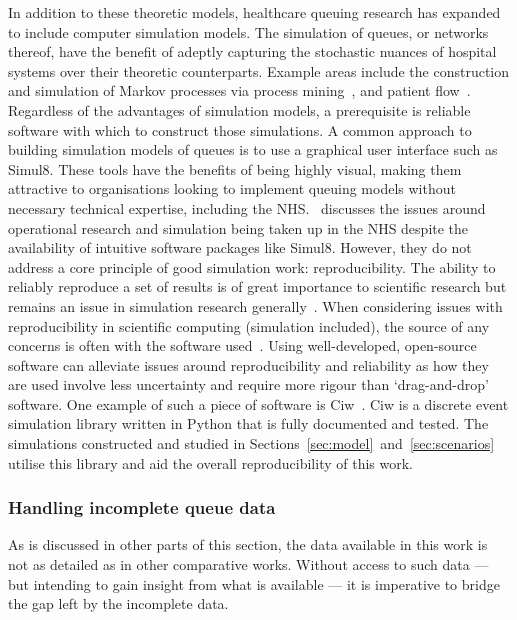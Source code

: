 \documentclass[11pt]{article}
\begin{document}
In addition to these theoretic models, healthcare queuing research has expanded
to include computer simulation models. The simulation of queues, or networks
thereof, have the benefit of adeptly capturing the stochastic nuances of
hospital systems over their theoretic counterparts. Example areas include the
construction and simulation of Markov processes via process
mining~\cite{Arnolds2018,Rebuge2012}, and patient flow~\cite{Bhattacharjee2014}.
Regardless of the advantages of simulation models, a prerequisite is reliable
software with which to construct those simulations. A common approach to
building simulation models of queues is to use a graphical user interface such
as Simul8. These tools have the benefits of being highly visual, making them
attractive to organisations looking to implement queuing models without
necessary technical expertise, including the NHS.~\cite{Brailsford2013}
discusses the issues around operational research and simulation being taken up
in the NHS despite the availability of intuitive software packages like Simul8.
However, they do not address a core principle of good simulation work:
reproducibility. The ability to reliably reproduce a set of results is of great
importance to scientific research but remains an issue in simulation research
generally~\cite{Fitzpatrick2019}. When considering issues with reproducibility
in scientific computing (simulation included), the source of any concerns is
often with the software used~\cite{Ivie2018}. Using well-developed, open-source
software can alleviate issues around reproducibility and reliability as how they
are used involve less uncertainty and require more rigour than ‘drag-and-drop’
software. One example of such a piece of software is Ciw~\cite{Palmer2019}. Ciw
is a discrete event simulation library written in Python that is fully
documented and tested. The simulations constructed and studied in
Sections~\ref{sec:model}~and~\ref{sec:scenarios} utilise this library and aid
the overall reproducibility of this work.

\subsubsection{Handling incomplete queue data}

As is discussed in other parts of this section, the data available in this work
is not as detailed as in other comparative works. Without access to such data
--- but intending to gain insight from what is available --- it is
imperative to bridge the gap left by the incomplete data.
\end{document}
